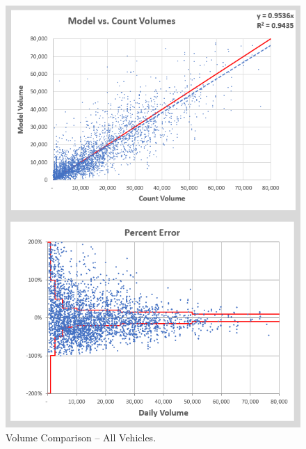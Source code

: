 \documentclass[
  letterpaper,
  DIV=11,
  numbers=noendperiod]{scrreprt}
\begin{document}
\begin{figure}[H]

{\centering \includegraphics[width=\textwidth,height=0.6\textheight]{v9x/v900/validation/_pictures/7-plot2.png}

}

\caption{\label{fig-allvehicles}Volume Comparison -- All Vehicles.}

\end{figure}
\end{document}
